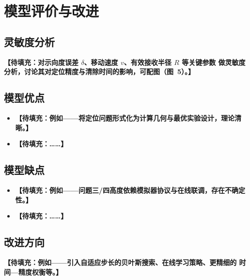 \section{模型评价与改进}

\subsection{灵敏度分析}
\textbf{【待填充：对示向度误差 $\delta$、移动速度 $v$、有效接收半径 $R$ 等关键参数
做灵敏度分析，讨论其对定位精度与清除时间的影响，可配图（图~5）。】}

\subsection{模型优点}
\begin{itemize}
    \item \textbf{【待填充：例如——将定位问题形式化为计算几何与最优实验设计，理论清晰。】}
    \item \textbf{【待填充：……】}
\end{itemize}

\subsection{模型缺点}
\begin{itemize}
    \item \textbf{【待填充：例如——问题三/四高度依赖模拟器协议与在线联调，存在不确定性。】}
    \item \textbf{【待填充：……】}
\end{itemize}

\subsection{改进方向}
\textbf{【待填充：例如——引入自适应步长的贝叶斯搜索、在线学习策略、更精细的
时间—精度权衡等。】}

